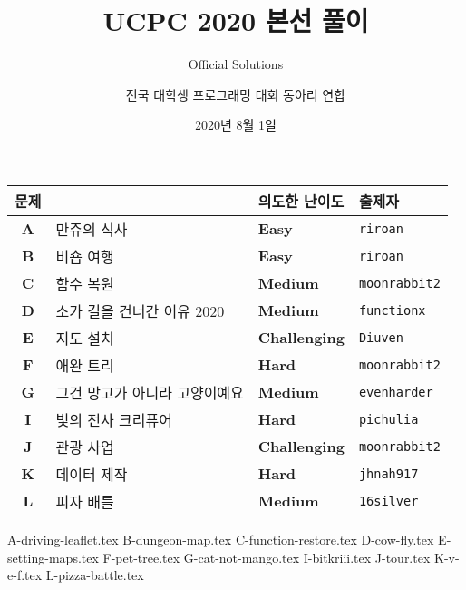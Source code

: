 
\usetikzlibrary{arrows.meta,matrix,decorations.pathreplacing}

\title{UCPC 2020 본선 풀이}
\subtitle{Official Solutions}
\author{전국 대학생 프로그래밍 대회 동아리 연합}
\date{2020년 8월 1일}


    \setcounter{framenumber}{-1}
    \frame{\titlepage}
        
    \begin{frame} %
        \begin{center}
            \begin{tabular}{cl|l|l}
                \hline
                문제 & & 의도한 난이도 & 출제자 \\
                \hline
                \hline
                \textbf{A} & 만쥬의 식사& \textbf{\color{acbronze}Easy} & \texttt{riroan} \\
                \textbf{B} & 비숍 여행 & \textbf{\color{acbronze}Easy} & \texttt{riroan} \\
                \textbf{C} & 함수 복원 & \textbf{\color{acplatinum}Medium} & \texttt{moonrabbit2} \\
                \textbf{D} & 소가 길을 건너간 이유 2020 & \textbf{\color{acplatinum}Medium} & \texttt{functionx} \\
                \textbf{E} & 지도 설치 & \textbf{\color{acdiamond}Challenging} & \texttt{Diuven} \\
                \textbf{F} & 애완 트리 & \textbf{\color{acdiamond}Hard} & \texttt{moonrabbit2} \\
                \textbf{G} & 그건 망고가 아니라 고양이예요 & \textbf{\color{acplatinum}Medium} & \texttt{evenharder} \\
                \textbf{I} & 빛의 전사 크리퓨어 & \textbf{\color{acdiamond}Hard} & \texttt{pichulia} \\
                \textbf{J} & 관광 사업 & \textbf{\color{acruby}Challenging} & \texttt{moonrabbit2} \\
                \textbf{K} & 데이터 제작 & \textbf{\color{acdiamond}Hard} & \texttt{jhnah917} \\
                \textbf{L} & 피자 배틀 & \textbf{\color{acplatinum}Medium} & \texttt{16silver} \\
                \hline
            \end{tabular}
        \end{center}
    \end{frame}
    {A-driving-leaflet.tex}
    {B-dungeon-map.tex}
    {C-function-restore.tex}
    {D-cow-fly.tex}
    {E-setting-maps.tex}
    {F-pet-tree.tex}
    {G-cat-not-mango.tex}
    {I-bitkriii.tex}
    {J-tour.tex}
    {K-v-e-f.tex}
    {L-pizza-battle.tex}

